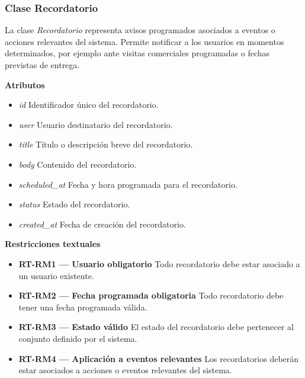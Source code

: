\subsubsection{Clase Recordatorio}

La clase \textit{Recordatorio} representa avisos programados asociados a eventos o acciones relevantes del sistema. Permite notificar a los usuarios en momentos determinados, por ejemplo ante visitas comerciales programadas o fechas previstas de entrega.

\textbf{Atributos}

\begin{itemize}

      \item \textit{id}
            Identificador único del recordatorio.
      \item \textit{user}
            Usuario destinatario del recordatorio.
      \item \textit{title}
            Título o descripción breve del recordatorio.
      \item \textit{body}
            Contenido del recordatorio.
      \item \textit{scheduled\_at}
            Fecha y hora programada para el recordatorio.
      \item \textit{status}
            Estado del recordatorio.
      \item \textit{created\_at}
            Fecha de creación del recordatorio.

\end{itemize}

\textbf{Restricciones textuales}

\begin{itemize}

      \item \textbf{RT-RM1 — Usuario obligatorio}
            Todo recordatorio debe estar asociado a un usuario existente.
      \item \textbf{RT-RM2 — Fecha programada obligatoria}
            Todo recordatorio debe tener una fecha programada válida.
      \item \textbf{RT-RM3 — Estado válido}
            El estado del recordatorio debe pertenecer al conjunto definido por el sistema.
      \item \textbf{RT-RM4 — Aplicación a eventos relevantes}
            Los recordatorios deberán estar asociados a acciones o eventos relevantes del sistema.

\end{itemize}

